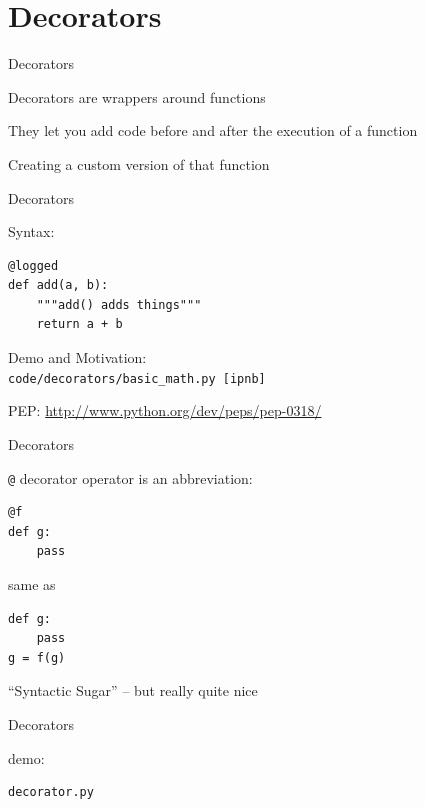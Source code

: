 \documentclass{beamer}
\begin{document}
\section{Decorators}

\begin{frame}[fragile]{Decorators}

{\LARGE Decorators are wrappers around functions}

\vfill
{\LARGE They let you add code before and after the execution of a function}

\vfill
{\LARGE Creating a custom version of that function}

\end{frame} 

\begin{frame}[fragile]{Decorators}

{\LARGE Syntax:}

\vfill
\begin{verbatim}
@logged
def add(a, b):
    """add() adds things"""
    return a + b
\end{verbatim}

\vfill
{\Large Demo and Motivation: \\
\verb|code/decorators/basic_math.py [ipnb]| }

\vfill
PEP: \url{http://www.python.org/dev/peps/pep-0318/}

\end{frame} 

\begin{frame}[fragile]{Decorators}

{\LARGE \verb|@| decorator operator is an abbreviation:}

{\large
\vfill
\begin{verbatim}
@f
def g:
    pass
\end{verbatim}

\vfill
same as

\vfill
\begin{verbatim}
def g:
    pass
g = f(g)
\end{verbatim}
}

\vfill
{\Large ``Syntactic Sugar'' -- but really quite nice}

\end{frame} 

\begin{frame}[fragile]{Decorators}

{\LARGE demo:

\vfill
\begin{verbatim}
decorator.py
\end{verbatim}

}
\end{frame} 
\end{document}
